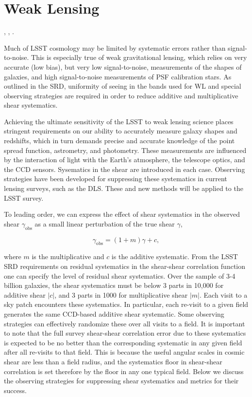 %
%

\section{Weak Lensing}
\def\secname{wl}\label{sec:\secname}

,
,
.

Much of LSST cosmology may be limited by systematic errors rather than
signal-to-noise. This is especially true of weak gravitational lensing,  which
relies on very accurate (\ie low bias), but very low signal-to-noise,
measurements of the shapes of galaxies, and high signal-to-noise measurements of
PSF calibration stars. As outlined in the SRD, uniformity of seeing in the bands
used for WL and special observing strategies are required in order to reduce
additive and multiplicative shear systematics.

Achieving the ultimate sensitivity of the LSST to weak lensing science places
stringent requirements on our ability to accurately measure galaxy shapes and
redshifts, which in turn demands precise and accurate knowledge of the point
spread function, astrometry, and photometry. These measurements are influenced
by the interaction of light with the Earth's atmosphere, the telescope optics,
and the CCD sensors. Sysematics in the shear are introduced in each case.
Observing strategies have been developed for suppressing these systematics in
current lensing surveys, such as the DLS.  These and new methods will be applied
to the LSST survey.

To leading order, we can express the effect of shear systematics in the observed
shear $\gamma_\mathrm{obs}$ as a small linear perturbation of the true shear
$\gamma$,

$$ \gamma_\mathrm{obs} = (1+m) \gamma + c, $$

where $m$ is the multiplicative and $c$ is the additive systematic.  From the
LSST SRD requirements on residual systematics in the shear-shear correlation
function one can specify the level of residual shear systematics.  Over the
sample of 3-4 billion galaxies, the shear systematics must be below 3 parts in
10,000 for additive shear $|c|$, and 3 parts in 1000 for multiplicative shear
$|m|$.  Each visit to a sky patch encounters these systematics.  In particular,
each re-visit to a given field generates the same CCD-based additive shear
systematic.  Some observing strategies can effectively randomize these over all
visits to a field.  It is important to note that the full survey shear-shear
correlation error due to these systematics is expected to be no better than the
corresponding systematic in any given field after all re-visits to that field.
This is because the useful angular scales in cosmic shear are less than a field
radius, and the systematics floor in shear-shear correlation is set therefore
by the floor in any one typical field.  Below we discuss the observing
strategies for suppressing shear systematics and metrics for their success.

